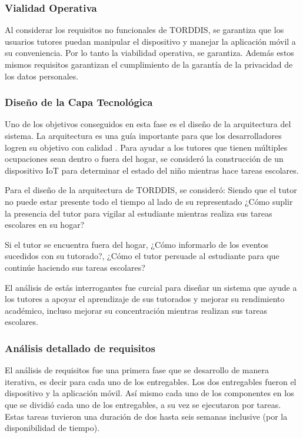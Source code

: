 \documentclass[a4paper,fleqn]{cas-sc}
\begin{document}
				\subsubsection*{Vialidad Operativa}
					Al considerar los requisitos no funcionales de TORDDIS, se garantiza que los usuarios tutores puedan manipular el dispositivo y manejar la aplicación móvil a su conveniencia. Por lo tanto la viabilidad operativa, se garantiza. Además estos mismos requisitos garantizan el cumplimiento de la garantía de la privacidad de los datos personales.
					
			\subsubsection{Diseño de la Capa Tecnológica}
				Uno de los objetivos conseguidos en esta fase es el diseño de la arquitectura del sistema. La arquitectura es una guía importante para que los desarrolladores logren su objetivo con calidad \citep{Liu2011Status}. Para ayudar a los tutores que tienen múltiples ocupaciones sean dentro o fuera del hogar, se consideró la construcción de un dispositivo IoT para determinar el estado del niño mientras hace tareas escolares. 
				
				Para el diseño de la arquitectura de TORDDIS, se consideró: Siendo que el tutor no puede estar presente todo el tiempo al lado de su representado ¿Cómo suplir la presencia del tutor para vigilar al estudiante mientras realiza sus tareas escolares en su hogar?
				
				Si el tutor se encuentra fuera del hogar, ¿Cómo informarlo de los eventos sucedidos con su tutorado?, ¿Cómo el tutor persuade al estudiante para que continúe haciendo sus tareas escolares? 
				
				El análisis de estás interrogantes fue curcial para diseñar un sistema que ayude a los tutores a apoyar el aprendizaje de sus tutorados y mejorar su rendimiento académico, incluso mejorar su concentración mientras realizan sus tareas escolares.
				
			\subsubsection{Análisis detallado de requisitos}
				El análisis de requisitos fue una primera fase que se desarrollo de manera iterativa, es decir para cada uno de los entregables. Los dos entregables fueron el dispositivo y la aplicación móvil. Así mismo cada uno de los componentes en los que se dividió cada uno de los entregables, a su vez se ejecutaron por tareas. Estas tareas tuvieron una duración de dos hasta seis semanas inclusive (por la disponibilidad de tiempo).
				
\end{document}
